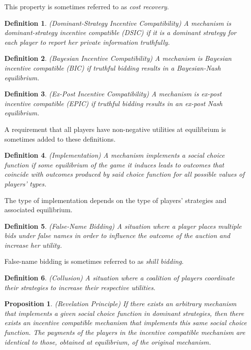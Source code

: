 \documentclass{article}
\newtheorem{proposition}{Proposition}
\newtheorem{definition}{Definition}
\begin{document}
This property is sometimes referred to as \textit{cost recovery}.

\begin{definition}
(Dominant-Strategy Incentive Compatibility) A mechanism is dominant-strategy incentive compatible (DSIC) if it is a dominant strategy for each player to report her private information truthfully.
\end{definition}

\begin{definition}
(Bayesian Incentive Compatibility) A mechanism is Bayesian incentive compatible (BIC) if truthful bidding results in a Bayesian-Nash equilibrium.
\end{definition}

\begin{definition}
(Ex-Post Incentive Compatibility) A mechanism is ex-post incentive compatible (EPIC) if truthful bidding results in an ex-post Nash equilibrium.
\end{definition}

A requirement that all players have non-negative utilities at equilibrium is sometimes added to these definitions.

\begin{definition}
(Implementation) A mechanism implements a social choice function if some equilibrium of the game it induces leads to outcomes that coincide with outcomes produced by said choice function for all possible values of players' types.
\end{definition}

The type of implementation depends on the type of players' strategies and associated equilibrium.

\begin{definition}
(False-Name Bidding) A situation where a player places multiple bids under false names in order to influence the outcome of the auction and increase her utility.
\end{definition}

False-name bidding is sometimes referred to as \textit{shill bidding}.

\begin{definition}
(Collusion) A situation where a coalition of players coordinate their strategies to increase their respective utilities.
\end{definition}

\begin{proposition}
(Revelation Principle) If there exists an arbitrary mechanism that implements a given social choice function in dominant strategies, then there exists an incentive compatible mechanism that implements this same social choice function. The payments of the players in the incentive compatible mechanism are identical to those, obtained at equilibrium, of the original mechanism.
\end{proposition}
\end{document}
